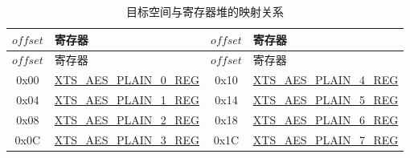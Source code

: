 \begin{longtable}[c]
{ |c|p{4.5cm} |c|p{4.5cm}|}
\caption{目标空间与寄存器堆的映射关系}
\label{tab:extmemencr-data-padding}\\
\hline
\rowcolor{lightgray}
\begin{math} offset \end{math}&  寄存器  & \begin{math} offset \end{math} &  寄存器 \\\hline
\endfirsthead
\hline
\rowcolor{lightgray}
\begin{math} offset \end{math} &  寄存器  & \begin{math} offset \end{math} &  寄存器   \\\hline
\endhead
\endfoot
0x00 & \hyperref[regdesc:XTSAESPLAINNREG]{XTS\_AES\_PLAIN\_0\_REG} & 0x10 & \hyperref[regdesc:XTSAESPLAINNREG]{XTS\_AES\_PLAIN\_4\_REG} \\\hline
0x04 & \hyperref[regdesc:XTSAESPLAINNREG]{XTS\_AES\_PLAIN\_1\_REG} & 0x14 & \hyperref[regdesc:XTSAESPLAINNREG]{XTS\_AES\_PLAIN\_5\_REG} \\\hline
0x08 & \hyperref[regdesc:XTSAESPLAINNREG]{XTS\_AES\_PLAIN\_2\_REG} & 0x18 & \hyperref[regdesc:XTSAESPLAINNREG]{XTS\_AES\_PLAIN\_6\_REG} \\\hline
0x0C & \hyperref[regdesc:XTSAESPLAINNREG]{XTS\_AES\_PLAIN\_3\_REG} & 0x1C & \hyperref[regdesc:XTSAESPLAINNREG]{XTS\_AES\_PLAIN\_7\_REG} \\\hline
\end{longtable}
